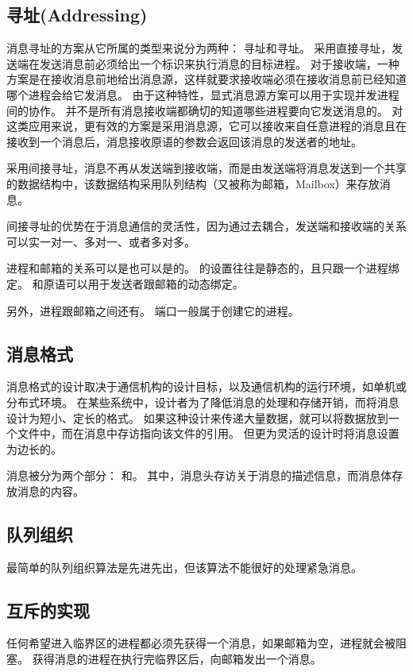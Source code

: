 {    \subsection{寻址(Addressing)}
    {
        消息寻址的方案从它所属的类型来说分为两种：
        寻址和寻址。
        采用直接寻址，发送端在发送消息前必须给出一个标识来执行消息的目标进程。
        对于接收端，一种方案是在接收消息前地给出消息源，这样就要求接收端必须在接收消息前已经知道哪个进程会给它发消息。
        由于这种特性，显式消息源方案可以用于实现并发进程间的协作。
        并不是所有消息接收端都确切的知道哪些进程要向它发送消息的。
        对这类应用来说，更有效的方案是采用消息源，它可以接收来自任意进程的消息且在接收到一个消息后，消息接收原语的参数会返回该消息的发送者的地址。

        采用间接寻址，消息不再从发送端到接收端，而是由发送端将消息发送到一个共享的数据结构中，该数据结构采用队列结构（又被称为邮箱，Mailbox）来存放消息。

        间接寻址的优势在于消息通信的灵活性，因为通过去耦合，发送端和接收端的关系可以实一对一、多对一、或者多对多。

        进程和邮箱的关系可以是也可以是的。
        的设置往往是静态的，且只跟一个进程绑定。
        和原语可以用于发送者跟邮箱的动态绑定。

        另外，进程跟邮箱之间还有。
        端口一般属于创建它的进程。
    }

    \subsection{消息格式}
    {
        消息格式的设计取决于通信机构的设计目标，以及通信机构的运行环境，如单机或分布式环境。
        在某些系统中，设计者为了降低消息的处理和存储开销，而将消息设计为短小、定长的格式。
        如果这种设计来传递大量数据，就可以将数据放到一个文件中，而在消息中存访指向该文件的引用。
        但更为灵活的设计时将消息设置为边长的。

        消息被分为两个部分：
        和。
        其中，消息头存访关于消息的描述信息，而消息体存放消息的内容。
    }

    \subsection{队列组织}
    {
        最简单的队列组织算法是先进先出，但该算法不能很好的处理紧急消息。
    }

    \subsection{互斥的实现}
    {
        任何希望进入临界区的进程都必须先获得一个消息，如果邮箱为空，进程就会被阻塞。
        获得消息的进程在执行完临界区后，向邮箱发出一个消息。
    }
}
